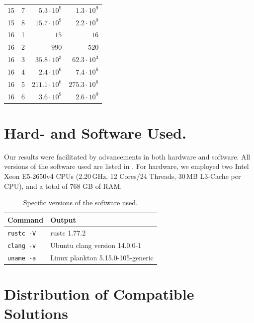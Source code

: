 \documentclass[a4paper,UKenglish,cleveref, autoref, thm-restate]{lipics-v2021}
\begin{document}
\begin{table}[!t]
\begin{tabular}{c|c|r|r}
    15  & 7   & $5.3 \cdot 10^9$        & $1.3 \cdot 10^9$         \\
    15  & 8   & $15.7 \cdot 10^9$       & $2.2 \cdot 10^9$         \\
    \hline
    16  & 1   & $15$                    & $16$                     \\
    16  & 2   & $990$                   & $520$                    \\
    16  & 3   & $35.8 \cdot 10^3$       & $62.3 \cdot 10^3$        \\
    16  & 4   & $2.4 \cdot 10^6$        & $7.4 \cdot 10^6$         \\
    16  & 5   & $211.1 \cdot 10^6$      & $275.3 \cdot 10^6$       \\
    16  & 6   & $3.6 \cdot 10^9$        & $2.6 \cdot 10^9$         \\
  \end{tabular}
\end{table}




\section{Hard- and Software Used.} \label{sec:hardware}

Our results were facilitated by advancements in both hardware and software.
All versions of the software used are listed in .
For hardware, we employed two Intel Xeon E5-2650v4 CPUs (2.20\,GHz, 12 Cores/24 Threads, 30\,MB L3-Cache per CPU), and a total of $768$ GB of RAM.

\begin{table}[!t]
  \renewcommand{\arraystretch}{1.1}
  \caption{Specific versions of the software used.}
  \label{table:command_outputs}
  \centering
  \small
  \begin{tabular}{l|l}
    \textbf{Command}  & \textbf{Output}                   \\ \hline
    \texttt{rustc -V} & rustc 1.77.2                      \\ \hline
    \texttt{clang -v} & Ubuntu clang version 14.0.0-1     \\ \hline
    \texttt{uname -a} & Linux plankton 5.15.0-105-generic \\
  \end{tabular}
\end{table}

\section{Distribution of Compatible Solutions}
\end{document}
